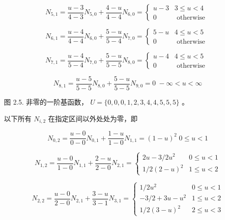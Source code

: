 \documentclass[../main.tex]{subfiles}
\begin{document}
\[
{N}_{5,1} = \frac{u - 3}{4 - 3}{N}_{5,0} + \frac{4 - u}{4 - 4}{N}_{6,0} = \left\{  \begin{array}{ll} u - 3 & 3 \leq  u < 4 \\  0 & \text{ otherwise } \end{array}\right.
\]

\[
{N}_{6,1} = \frac{u - 4}{4 - 4}{N}_{6,0} + \frac{5 - u}{5 - 4}{N}_{7,0} = \left\{  \begin{array}{ll} 5 - u & 4 \leq  u < 5 \\  0 & \text{ otherwise } \end{array}\right.
\]

\[
{N}_{7,1} = \frac{u - 4}{5 - 4}{N}_{7,0} + \frac{5 - u}{5 - 5}{N}_{8,0} = \left\{  \begin{array}{ll} u - 4 & 4 \leq  u < 5 \\  0 & \text{ otherwise } \end{array}\right.
\]

\[
{N}_{8,1} = \frac{u - 5}{5 - 5}{N}_{8,0} + \frac{5 - u}{5 - 5}{N}_{9,0} = 0\; - \infty  < u < \infty
\]




\begin{center}
\begin{minipage}{18cm}
\vspace*{.6\baselineskip}
\centering
{}
\par\smallskip
图 2.5. 非零的一阶基函数， \(U = \{ 0,0,0,1,2,3,4,4,5,5,5\}\) 。
\end{minipage}
\end{center}

以下所有 \({N}_{i,2}\) 在指定区间以外处处为零，即

\[
{N}_{0,2} = \frac{u - 0}{0 - 0}{N}_{0,1} + \frac{1 - u}{1 - 0}{N}_{1,1} = {\left( 1 - u\right) }^{2}\;0 \leq  u < 1
\]

\[
{N}_{1,2} = \frac{u - 0}{1 - 0}{N}_{1,1} + \frac{2 - u}{2 - 0}{N}_{2,1} = \left\{  \begin{array}{ll} {2u} - 3/2{u}^{2} & 0 \leq  u < 1 \\  1/2{\left( 2 - u\right) }^{2} & 1 \leq  u < 2 \end{array}\right.
\]

\[
{N}_{2,2} = \frac{u - 0}{2 - 0}{N}_{2,1} + \frac{3 - u}{3 - 1}{N}_{3,1} = \left\{  \begin{matrix} 1/2{u}^{2} & 0 \leq  u < 1 \\   - 3/2 + {3u} - {u}^{2} & 1 \leq  u < 2 \\  1/2{\left( 3 - u\right) }^{2} & 2 \leq  u < 3 \end{matrix}\right.
\]
\end{document}
